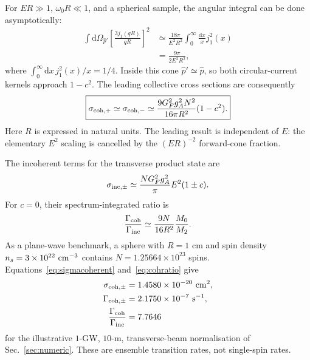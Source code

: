 \documentclass[aps,prd,10pt,onecolumn,nofootinbib,amsmath,amssymb]{revtex4-1}
\newcommand{\dd}{\mathrm{d}}
\begin{document}
For \(ER\gg1\), \(\omega_0R\ll1\), and a spherical sample, the angular
integral can be done asymptotically:
\begin{equation}
\begin{aligned}
 \int\dd\Omega_{\hat p'}
 \left[\frac{3j_1(qR)}{qR}\right]^2
 &\simeq\frac{18\pi}{E^2R^2}
 \int_0^\infty\frac{\dd x}{x}j_1^2(x)\\
 &=\frac{9\pi}{2E^2R^2},
\end{aligned}
\label{eq:Wangular}
\end{equation}
where
\(\int_0^\infty\dd x\,j_1^2(x)/x=1/4\).
Inside this cone \(\hat p'\simeq\hat p\), so both circular-current kernels
approach \(1-c^2\).  The leading collective cross sections are consequently
\begin{equation}
\boxed{
 \sigma_{{\rm coh},+}
 \simeq\sigma_{{\rm coh},-}
 \simeq
 \frac{9G_F^2g_A^2N^2}{16\pi R^2}(1-c^2).}
\label{eq:sigmacoherent}
\end{equation}
Here \(R\) is expressed in natural units.  The leading result is independent
of \(E\): the elementary \(E^2\) scaling is cancelled by the
\((ER)^{-2}\) forward-cone fraction.

The incoherent terms for the transverse product state are
\begin{equation}
 \sigma_{{\rm inc},\pm}
 \simeq
 \frac{NG_F^2g_A^2}{\pi}E^2(1\pm c).
\label{eq:sigmaincoherent}
\end{equation}
For \(c=0\), their spectrum-integrated ratio is
\begin{equation}
 \frac{\Gamma_{\rm coh}}{\Gamma_{\rm inc}}
 \simeq\frac{9N}{16R^2}\frac{M_0}{M_2}.
\label{eq:cohratio}
\end{equation}
As a plane-wave benchmark, a sphere with \(R=1\) cm and spin density
\(n_s=3\times10^{22}\ {\rm cm}^{-3}\) contains
\(N=1.25664\times10^{23}\) spins.  Equations~\eqref{eq:sigmacoherent}
and~\eqref{eq:cohratio} give
\begin{equation}
\begin{aligned}
 \sigma_{{\rm coh},\pm}
 &=1.4580\times10^{-20}\ {\rm cm}^2,\\
 \Gamma_{{\rm coh},\pm}
 &=2.1750\times10^{-7}\ {\rm s}^{-1},\\
 \frac{\Gamma_{\rm coh}}{\Gamma_{\rm inc}}
 &=7.7646
\end{aligned}
\end{equation}
for the illustrative \(1\)-GW, \(10\)-m, transverse-beam normalisation of
Sec.~\ref{sec:numeric}.  These are ensemble transition rates, not
single-spin rates.
\end{document}
